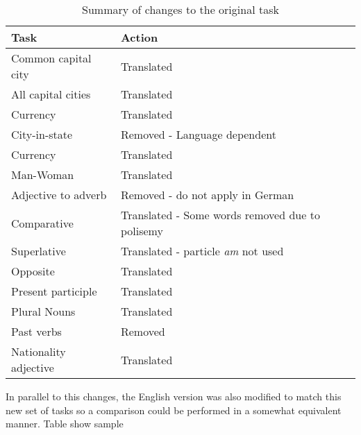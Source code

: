  \begin{table}[h]
   \centering
   \caption{Summary of changes to the original task } 
   \label{tab:summary_of_changes_task}
   \small
   \begin{tabular}{ |l|l|  }

   \hline           
   Task  & Action   \\  \hline           
   Common capital city & Translated \\
   All capital cities  & Translated \\
   Currency & Translated  \\ 
   City-in-state   &  Removed - Language dependent \\
   Currency & Translated  \\
   Man-Woman  & Translated  \\
   Adjective to adverb  &  Removed - do not apply in German \\
   Comparative & Translated - Some words removed due to polisemy \\ 
   Superlative & Translated - particle \textit{am} not used \\
   Opposite  & Translated \\
   Present participle & Translated \\
   Plural Nouns  & Translated \\
   Past verbs &  Removed \\

   Nationality adjective & Translated \\
   
\hline

  
\end{tabular}
\end{table}
    
In parallel to this changes, the English version was also modified to match
this new set of tasks so a comparison could be performed in a somewhat
equivalent manner.  Table show sample 


